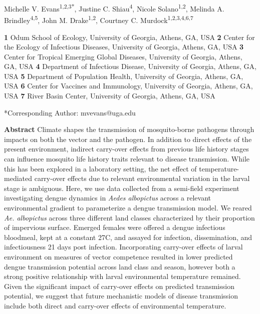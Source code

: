 \documentclass[12pt]{article}
\begin{document}
\setlength\parindent{0pt}%

{\Large
\textbf{}}

\bigskip

\newline
Michelle V. Evans\textsuperscript{1,2,3*},
Justine C. Shiau\textsuperscript{4},
Nicole Solano\textsuperscript{1,2},
Melinda A. Brindley\textsuperscript{4,5},
John M. Drake\textsuperscript{1,2},
Courtney C. Murdock\textsuperscript{1,2,3,4,6,7}
\smallskip


\textbf{1} Odum School of Ecology, University of Georgia, Athens, GA, USA
\newline
\textbf{2} Center for the Ecology of Infectious Diseases, University of Georgia, Athens, GA, USA
\newline
\textbf{3} Center for Tropical Emerging Global Diseases, University of Georgia, Athens, GA, USA
\newline
\textbf{4} Department of Infectious Disease, University of Georgia, Athens, GA, USA
\newline
\textbf{5} Department of Population Health, University of Georgia, Athens, GA, USA
\newline
\textbf{6} Center for Vaccines and Immunology, University of Georgia, Athens, GA, USA
\newline
\textbf{7} River Basin Center, University of Georgia, Athens, GA, USA
\smallskip

\noindent
*Corresponding Author: mvevans@uga.edu
\bigskip

\newpage

\textbf{Abstract} Climate shapes the transmission of mosquito-borne pathogens through impacts on both the vector and the pathogen.  In addition to direct effects of the present environment, indirect carry-over effects from previous life history stages can influence mosquito life history traits relevant to disease transmission. While this has been explored in a laboratory setting, the net effect of temperature-mediated carry-over effects due to relevant environmental variation in the larval stage is ambiguous. Here, we use data collected from a semi-field experiment investigating dengue dynamics in \textit{Aedes albopictus} across a relevant environmental gradient to parameterize a dengue transmission model. We reared \textit{Ae. albopictus} across three different land classes characterized by their proportion of impervious surface. Emerged females were offered a dengue infectious bloodmeal, kept at a constant 27C, and assayed for infection, dissemination, and infectiousness 21 days post infection. Incorporating carry-over effects of larval environment on measures of vector competence resulted in lower predicted dengue transmission potential across land class and season, however both a strong positive relationship with larval environmental temperature remained. Given the significant impact of carry-over effects on predicted transmission potential, we suggest that future mechanistic models of disease transmission include both direct and carry-over effects of environmental temperature.
\end{document}
